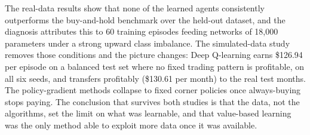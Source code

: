 The real-data results show that none of the learned agents consistently
outperforms the buy-and-hold benchmark over the held-out dataset, and
the diagnosis attributes this to 60 training episodes feeding networks
of 18,000 parameters under a strong upward class imbalance. The
simulated-data study removes those conditions and the picture changes:
Deep Q-learning earns \$126.94 per episode on a balanced test set where
no fixed trading pattern is profitable, on all six seeds, and transfers profitably
(\$130.61 per month) to the real test months. The policy-gradient
methods collapse to fixed corner policies once always-buying stops
paying. The conclusion that survives both studies is that the data, not
the algorithms, set the limit on what was learnable, and that value-based
learning was the only method able to exploit more data once it was
available.
